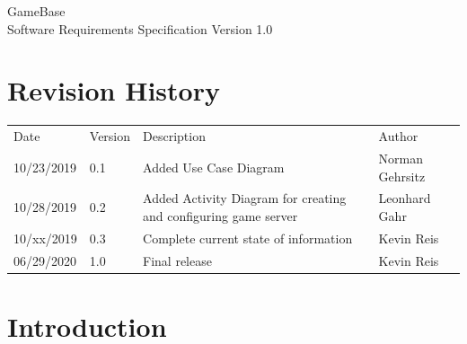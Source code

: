 \documentclass[a4paper,12pt,chapterprefix=false,bibliography=totoc,listof=totoc,]{scrreprt}
\begin{document}
	
\begin{flushright}
GameBase
\\
Software Requirements Specification
\bigbreak
Version 1.0
\end{flushright}
\chapter*{Revision History}
\begin{table}[H]
	\centering
	\everyrow{\hline}
	\begin{tabu} to \textwidth {|X[c]|X[c]|X[c]|X[c]|}
		Date & Version & Description & Author\\
		10/23/2019 & 0.1 & Added Use Case Diagram & Norman Gehrsitz \\
		10/28/2019 & 0.2 & Added Activity Diagram for creating and configuring game server & Leonhard Gahr \\
		10/xx/2019 & 0.3 & Complete current state of information & Kevin Reis \\
		06/29/2020 & 1.0 & Final release & Kevin Reis \\
	\end{tabu}
	\label{tab:rev-hist}
\end{table}

\tableofcontents

\chapter{Introduction}

\end{document}
